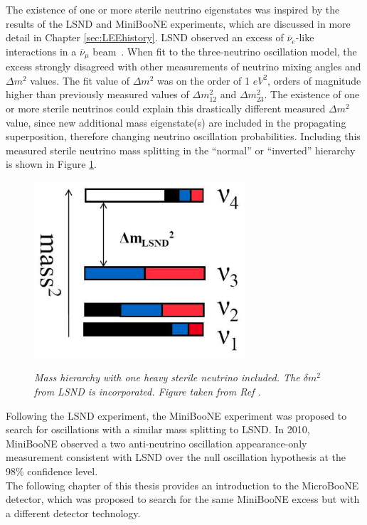 The existence of one or more sterile neutrino eigenstates was inspired by the results of the LSND and MiniBooNE experiments, which are discussed in more detail in Chapter \ref{sec:LEEhistory}. LSND observed an excess of $\overline{\nu}_e$-like interactions in a $\overline{\nu}_\mu$ beam~\cite{LSNDPaper}. When fit to the three-neutrino oscillation model, the excess strongly disagreed with other measurements of neutrino mixing angles and $\Delta m^2$ values. The fit value of $\Delta m^2$ was on the order of 1 $eV^2$, orders of magnitude higher than previously measured values of $\Delta m_{12}^2$ and $\Delta m_{23}^2$. The existence of one or more sterile neutrinos could explain this drastically different measured $\Delta m^2$ value, since new additional mass eigenstate(s) are included in the propagating superposition, therefore changing neutrino oscillation probabilities. Including this measured sterile neutrino mass splitting in the ``normal'' or ``inverted'' hierarchy is shown in Figure \ref{sterile_nu_hierarchy_fig}.\\

\begin{figure}[ht!]
\centering
	\includegraphics[width=0.7\textwidth]{Figures/sterile_masssplitting.png} \\
\caption{\textit{Mass hierarchy with one heavy sterile neutrino included. The $\delta m^2$ from LSND is incorporated. Figure taken from Ref \protect\cite{GaryThesis}.}\label{sterile_nu_hierarchy_fig}}
\end{figure}

Following the LSND experiment, the MiniBooNE experiment was proposed to search for oscillations with a similar mass splitting to LSND. In 2010, MiniBooNE observed a two anti-neutrino oscillation appearance-only measurement consistent with LSND over the null oscillation hypothesis at the 98\% confidence level.\\

The following chapter of this thesis provides an introduction to the MicroBooNE detector, which was proposed to search for the same MiniBooNE excess but with a different detector technology.

